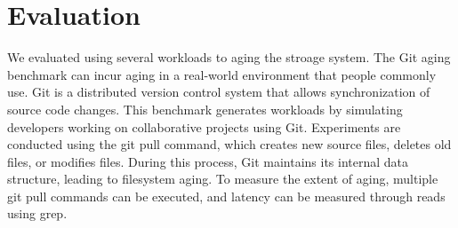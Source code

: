 \section{Evaluation}\label{s:eval}

We evaluated using several workloads to aging the stroage system.
The Git aging benchmark\cite{conway:login17,senescence:fast17} can incur aging in a real-world environment that people commonly use.
Git is a distributed version control system that allows synchronization of source code changes.
This benchmark generates workloads by simulating developers working on collaborative projects using Git.
Experiments are conducted using the git pull command, which creates new source files, deletes old files, or modifies files. During this process, Git maintains its internal data structure, leading to filesystem aging.
To measure the extent of aging, multiple git pull commands can be executed, and latency can be measured through reads using grep.



